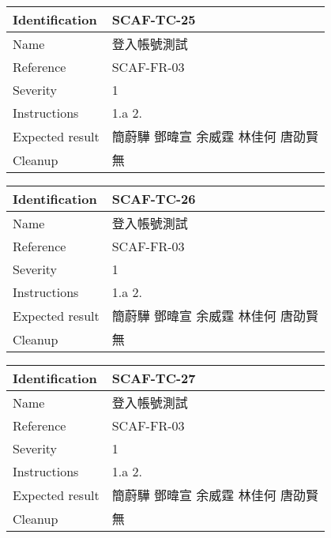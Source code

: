 \documentclass{report}
\begin{document}
\begin{tabularx}{0.9\textwidth}{
  |p{}%
  |p{}|%
  }
  \hline
  \centering Identification &  SCAF-TC-25 \\
  \hline
  \centering Name & 登入帳號測試 \\
  \hline
  \centering Reference & SCAF-FR-03 \\
  \hline
  \centering Severity & 1 \\
  \hline
  \centering Instructions & 1.a
                            2. \\
  \hline
  \centering Expected result & 簡蔚驊 \! 鄧暐宣 \! 余威霆 \! 林佳何 \! 唐劭賢 \\
  \hline
  \centering Cleanup & 無 \\
  \hline
\end{tabularx}
\newline\newline

\begin{tabularx}{0.9\textwidth}{
  |p{}%
  |p{}|%
  }
  \hline
  \centering Identification &  SCAF-TC-26 \\
  \hline
  \centering Name & 登入帳號測試 \\
  \hline
  \centering Reference & SCAF-FR-03 \\
  \hline
  \centering Severity & 1 \\
  \hline
  \centering Instructions & 1.a
                            2. \\
  \hline
  \centering Expected result & 簡蔚驊 \! 鄧暐宣 \! 余威霆 \! 林佳何 \! 唐劭賢 \\
  \hline
  \centering Cleanup & 無 \\
  \hline
\end{tabularx}
\newline\newline

\begin{tabularx}{0.9\textwidth}{
  |p{}%
  |p{}|%
  }
  \hline
  \centering Identification &  SCAF-TC-27 \\
  \hline
  \centering Name & 登入帳號測試 \\
  \hline
  \centering Reference & SCAF-FR-03 \\
  \hline
  \centering Severity & 1 \\
  \hline
  \centering Instructions & 1.a
                            2. \\
  \hline
  \centering Expected result & 簡蔚驊 \! 鄧暐宣 \! 余威霆 \! 林佳何 \! 唐劭賢 \\
  \hline
  \centering Cleanup & 無 \\
  \hline
\end{tabularx}
\newline\newline
\end{document}

